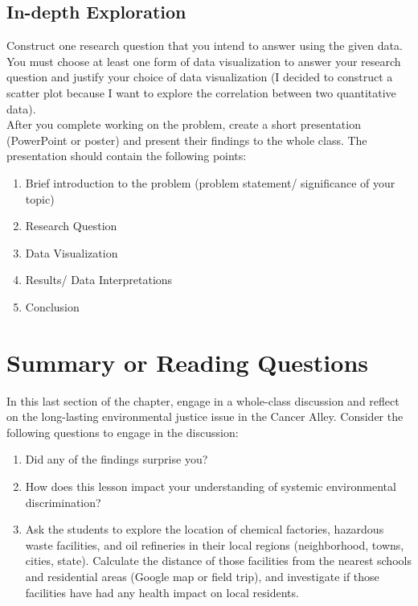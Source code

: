 \documentclass[a4paper, 11pt]{article}
\begin{document}
\subsection{In-depth Exploration}
%
	Construct one research question that you intend to answer using the given data. You must choose at least one form of data visualization to answer your research question and justify your choice of data visualization (I decided to construct a scatter plot because I want to explore the correlation between two quantitative data).\\[1ex]
	After you complete working on the problem, create a short presentation (PowerPoint or poster) and present their findings to the whole class. The presentation should contain the following points:
	\begin{enumerate}[label=\alph*), itemsep=0.5ex]
		\item 
		Brief introduction to the problem (problem statement/ significance of your topic)
	\item 
		Research Question
\item 
		Data Visualization
\item 
		Results/ Data Interpretations
\item 
		Conclusion
	\end{enumerate}
%
%
%
\section{Summary or Reading Questions}
%
%
	In this last section of the chapter, engage in a whole-class discussion and reflect on the long-lasting environmental justice issue in the Cancer Alley. Consider the following questions to engage in the discussion:
	\begin{enumerate}[label=\alph*), itemsep=0.5ex]
		\item Did any of the findings surprise you?
		\item How does this lesson impact your understanding of systemic environmental discrimination?
		\item Ask the students to explore the location of chemical factories, hazardous waste facilities, and oil refineries in their local regions (neighborhood, towns, cities, state). Calculate the distance of those facilities from the nearest schools and residential areas (Google map or field trip), and investigate if those facilities have had any health impact on local residents.
	\end{enumerate}
%
%
%
%
\end{document}
